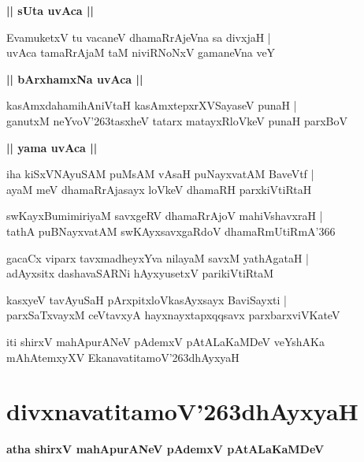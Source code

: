 \documentclass[twoside,12pt,openright]{book}
\def\S{\char'263}
\newcounter{shloka}[chapter]
\def\uvaca#1{\centerline{{\large\textbf{#1}}}}
\begin{document}
\uvaca{|| sUta uvAca ||}

\begin{shloka}%
EvamuketxV tu vacaneV dhamaRrAjeVna sa divxjaH |\\
uvAca tamaRrAjaM taM niviRNoNxV gamaneVna veY 
\end{shloka}

\uvaca{|| bArxhamxNa uvAca ||}

\begin{shloka}%
kasAmxdahamihAniVtaH kasAmxtepxrXVSayaseV punaH |\\
ganutxM neYvoV\S tasxheV tatarx matayxRloVkeV punaH parxBoV
\end{shloka}

\uvaca{|| yama uvAca ||}

\begin{shloka}%
iha kiSxVNAyuSAM puMsAM vAsaH puNayxvatAM BaveVtf |\\
ayaM meV dhamaRrAjasayx loVkeV dhamaRH parxkiVtiRtaH 
\end{shloka}

\begin{shloka}%
swKayxBumimiriyaM savxgeRV dhamaRrAjoV mahiVshavxraH |\\
tathA puBNayxvatAM swKAyxsavxgaRdoV dhamaRmUtiRmA\char'366 
\end{shloka}

\begin{shloka}%
gacaCx viparx tavxmadheyxYva nilayaM savxM yathAgataH |\\
adAyxsitx dashavaSARNi hAyxyusetxV parikiVtiRtaM 
\end{shloka}

\begin{shloka}%
kasxyeV tavAyuSaH pArxpitxloVkasAyxsayx BaviSayxti |\\
parxSaTxvayxM ceVtavxyA hayxnayxtapxqqsavx parxbarxviVKateV 
\end{shloka}

\begin{center}
iti shirxV mahApurANeV pAdemxV pAtALaKaMDeV veYshAKa mAhAtemxyXV 
EkanavatitamoV\S dhAyxyaH
\end{center}

\chapter{divxnavatitamoV\S dhAyxyaH}

\begin{center}
{\LARGE\bfseries atha shirxV mahApurANeV pAdemxV pAtALaKaMDeV }
\end{center}
\end{document}
